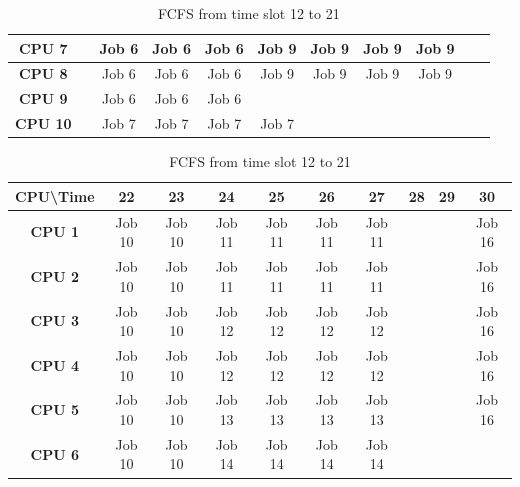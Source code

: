 \documentclass[11pt]{article}
\begin{document}
\begin{table}[]
\begin{tabular}{|c|c|c|c|c|c|c|c|c|c|c|}
\textbf{CPU 7}                   &             & Job 6       & Job 6       & Job 6       & Job 9       & Job 9       & Job 9       & Job 9       &             &             \\ \hline
\textbf{CPU 8}                   &             & Job 6       & Job 6       & Job 6       & Job 9       & Job 9       & Job 9       & Job 9       &             &             \\ \hline
\textbf{CPU 9}                   &             & Job 6       & Job 6       & Job 6       &             &             &             &             &             &             \\ \hline
\textbf{CPU 10}                  &             & Job 7       & Job 7       & Job 7       & Job 7       &             &             &             &             &             \\ \hline
\end{tabular}
\caption{\label{FCFS12}FCFS from time slot 12 to 21}
\vspace{1cm}
\begin{tabular}{|c|c|c|c|c|c|c|c|c|c|}
\hline
\textbf{CPU\textbackslash{}Time} & \textbf{22} & \textbf{23} & \textbf{24} & \textbf{25} & \textbf{26} & \textbf{27} & \textbf{28} & \textbf{29} & \textbf{30} \\ \hline
\textbf{CPU 1}                   & Job 10      & Job 10      & Job 11      & Job 11      & Job 11      & Job 11      &             &             & Job 16      \\ \hline
\textbf{CPU 2}                   & Job 10      & Job 10      & Job 11      & Job 11      & Job 11      & Job 11      &             &             & Job 16      \\ \hline
\textbf{CPU 3}                   & Job 10      & Job 10      & Job 12      & Job 12      & Job 12      & Job 12      &             &             & Job 16      \\ \hline
\textbf{CPU 4}                   & Job 10      & Job 10      & Job 12      & Job 12      & Job 12      & Job 12      &             &             & Job 16      \\ \hline
\textbf{CPU 5}                   & Job 10      & Job 10      & Job 13      & Job 13      & Job 13      & Job 13      &             &             & Job 16      \\ \hline
\textbf{CPU 6}                   & Job 10      & Job 10      & Job 14      & Job 14      & Job 14      & Job 14      &             &             &             \\ \hline

\end{tabular}
\end{table}
\end{document}
